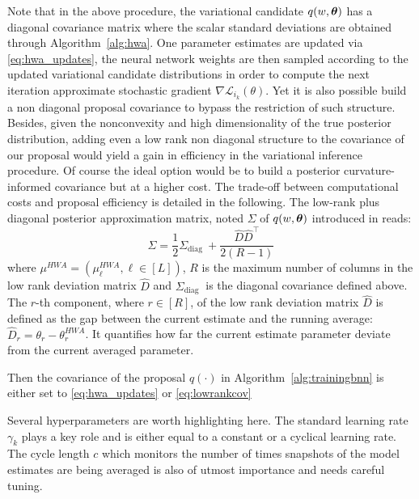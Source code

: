 \documentclass[tablecaption=bottom,wcp]{jmlr} %
\begin{document}
Note that in the above procedure, the variational candidate $q(w, \param)$ has a diagonal covariance matrix where the scalar standard deviations are obtained through Algorithm~\ref{alg:hwa}.
One parameter estimates are updated via \eqref{eq:hwa_updates}, the neural network weights are then sampled according to the updated variational candidate distributions in order to compute the next iteration approximate stochastic gradient $\nabla \mathcal{L}_{i_{k}}(\theta)$.
Yet it is also possible build a non diagonal proposal covariance to bypass the restriction of such structure.
Besides, given the nonconvexity and high dimensionality of the true posterior distribution, adding even a low rank non diagonal structure to the covariance of our proposal would yield a gain in efficiency in the variational inference procedure.
Of course the ideal option would be to build a posterior curvature-informed covariance but at a higher cost.
The trade-off between computational costs and proposal efficiency is detailed in the following.
The low-rank plus diagonal posterior approximation matrix, noted $\Sigma$ of $q(w, \param)$ introduced in \citep{maddox2019simple} reads:
\begin{equation}\label{eq:lowrankcov}
\Sigma = \frac{1}{2} \Sigma_{\text {diag }}+\frac{\widehat{D} \widehat{D}^{\top}}{2(R-1)}
\end{equation}
where $\mu^{HWA} = (\mu_{\ell}^{HWA}, \ell \in [L])$, $R$ is the maximum number of columns in the low rank deviation matrix $\widehat{D}$ and $\Sigma_{\text {diag }}$ is the diagonal covariance defined above. The $r$-th component, where $r \in [R]$, of the  low rank deviation matrix $\widehat{D}$ is defined as the gap between the current estimate and the running average: $\widehat{D}_r = \theta_r - \theta^{HWA}_r$. It quantifies how far the current estimate parameter deviate from the current averaged parameter.

Then the covariance of the proposal $q(\cdot)$ in Algorithm~\ref{alg:trainingbnn} is either set to \eqref{eq:hwa_updates} or \eqref{eq:lowrankcov}

Several hyperparameters are worth highlighting here.
The standard learning rate $\gamma_k$ plays a key role and is either equal to a constant or a cyclical learning rate.
The cycle length $c$ which monitors the number of times snapshots of the model estimates are being averaged is also of utmost importance and needs careful tuning.
\end{document}
